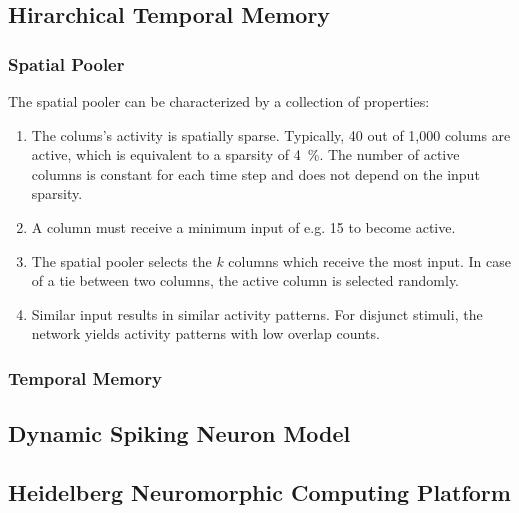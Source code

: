 \subsection{Hirarchical Temporal Memory}

\subsubsection{Spatial Pooler}
\label{sec:spatial_pooler_properties}

The spatial pooler can be characterized by a collection of properties:

\begin{enumerate}
	\item\label{enm:spatial_pooler_sparsity} The colums's activity is spatially sparse. Typically, 40 out of 1,000 colums are active, which is equivalent to a sparsity of \SI{4}{\%}. The number of active columns is constant for each time step and does not depend on the input sparsity.
	\item\label{enm:spatial_pooler_minimum} A column must receive a minimum input of e.g. 15 to become active.
	\item\label{enm:spatial_pooler_selection} The spatial pooler selects the $k$ columns which receive the most input. In case of a tie between two columns, the active column is selected randomly.
	\item\label{enm:spatial_pooler_overlap} Similar input results in similar activity patterns. For disjunct stimuli, the network yields activity patterns with low overlap counts.
\end{enumerate}

\subsubsection{Temporal Memory}

\subsection{Dynamic Spiking Neuron Model}

\subsection{Heidelberg Neuromorphic Computing Platform}
